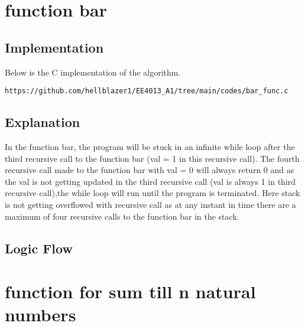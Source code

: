 \documentclass[journal,12pt,twocolumn]{IEEEtran}
\begin{document}
\section{function bar}

\subsection{Implementation}
Below is the C implementation of the algorithm.
\begin{lstlisting}
https://github.com/hellblazer1/EE4013_A1/tree/main/codes/bar_func.c
\end{lstlisting}

\subsection{Explanation}
In the function bar, the program will be stuck in an infinite while loop after the third recursive call to the function bar (val = 1 in this recursive call). The fourth recursive call made to the function bar with val = 0 will always return 0 and as the val is not getting updated in the third recursive call (val is always 1 in third recursive call),the while loop will run until the program is terminated. Here stack is not getting overflowed with recursive call as at any instant in time there are a maximum of four recursive calls to the function bar in the stack. 


\subsection{Logic Flow}

\begin{figure}[!h]
\centering
{}
\end{figure}


\section{function for sum till n natural numbers}
\end{document}
